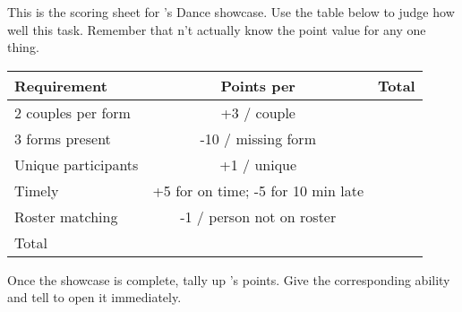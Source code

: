 \documentclass[green]{NeptuneBall}
\begin{document}
\name{\gDanceScoring{}}

This is the scoring sheet for \cPrincess{}'s Dance showcase. Use the table below to judge how well \cPrincess{\they}  this task. Remember that \cPrincess{\they} \cPrincess{\does}n't actually know the point value for any one thing.

\begin{tabular}{| l | c | r |}
  \hline
  Requirement & Points per & Total \\ \hline \hline
  2 couples per form & +3 / couple & \hspace{2cm} \\ \hline
  3 forms present & -10 / missing form & \hspace{2cm} \\ \hline
  Unique participants & +1 / unique & \hspace{2cm} \\ \hline
  Timely & +5 for on time; -5 for 10 min late & \hspace{2cm} \\ \hline
  Roster matching & -1 / person not on roster & \hspace{2cm} \\ \hline \hline
  Total & & \hspace{2cm} \\ \hline
\end{tabular}

Once the showcase is complete, tally up \cPrincess{}'s points. Give \cPrincess{\them} the corresponding ability and tell \cPrincess{\them} to open it immediately.
  
\end{document}
